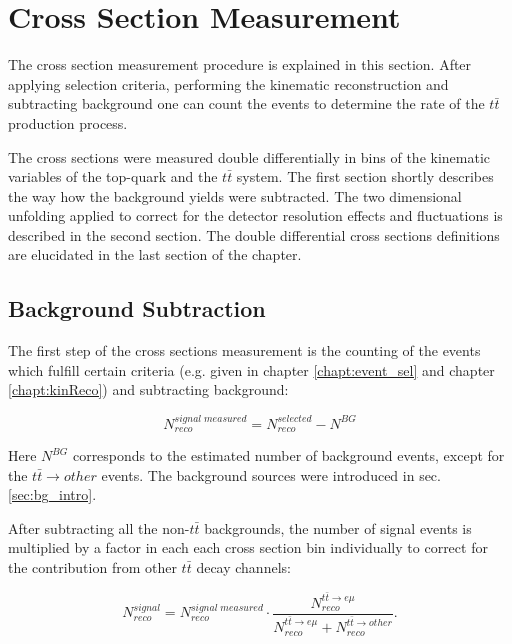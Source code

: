 \chapter{Cross Section Measurement}\label{chapt:xsec}

The cross section measurement procedure is explained in this section.
After applying selection criteria, performing the kinematic reconstruction and subtracting background
one can count the events to determine the rate of the $t\bar{t}$ production process.

The cross sections were measured double differentially in bins of the kinematic variables of the top-quark and the $t\bar{t}$ system.
The first section shortly describes the way how the background yields were subtracted.
The two dimensional unfolding applied to correct for the detector resolution effects and fluctuations is described
in the second section.
The double differential cross sections definitions are elucidated in the last section of the chapter.

\section{Background Subtraction}
The first step of the cross sections measurement is the counting of the events which fulfill certain criteria (e.g. given in 
chapter \ref{chapt:event_sel} and chapter \ref{chapt:kinReco}) and subtracting background: 

\begin{equation}\label{eq:bgsub}
 N^{signal\;measured}_{reco} = N^{selected}_{reco} - N^{BG}
\end{equation}

Here $N^{BG}$ corresponds to the estimated number of background events, except for the $t\bar{t} \rightarrow other$ events. The background sources 
were introduced in sec. \ref{sec:bg_intro}.

After subtracting all the non-$t\bar{t}$ backgrounds, the number of signal events is multiplied by a factor in each each cross section bin
individually to correct for the contribution from other $t\bar{t}$ decay channels:

\begin{equation}\label{eq:bgsub}
 N^{signal}_{reco} = N^{signal\;measured}_{reco} \cdot \frac{N^{t\bar{t} \rightarrow e\mu}_{reco}}{N^{t\bar{t} \rightarrow e\mu}_{reco} + N^{t\bar{t} \rightarrow other}_{reco}}.
\end{equation}

